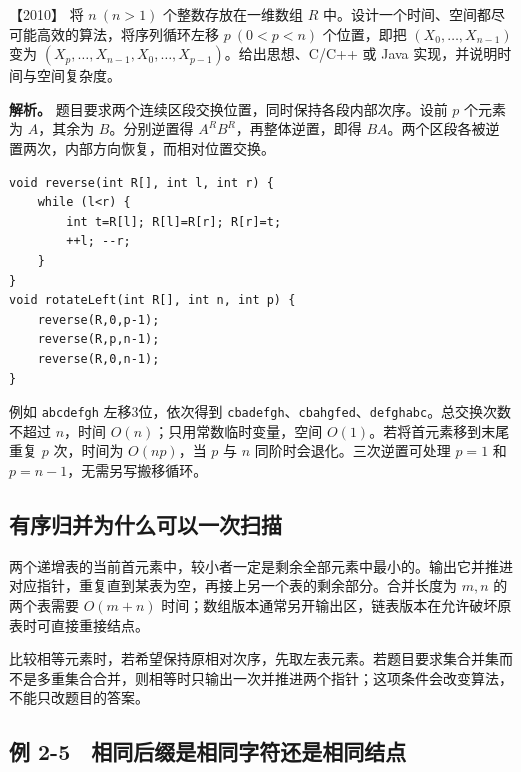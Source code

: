 \noindent{}【2010】 将 \(n\ (n>1)\) 个整数存放在一维数组 \(R\) 中。设计一个时间、空间都尽可能高效的算法，将序列循环左移 \(p\ (0<p<n)\) 个位置，即把 \((X_0,\ldots,X_{n-1})\) 变为 \((X_p,\ldots,X_{n-1},X_0,\ldots,X_{p-1})\)。给出思想、C/C++ 或 Java 实现，并说明时间与空间复杂度。


\textbf{解析。} 题目要求两个连续区段交换位置，同时保持各段内部次序。设前 \(p\) 个元素为 \(A\)，其余为 \(B\)。分别逆置得 \(A^RB^R\)，再整体逆置，即得 \(BA\)。两个区段各被逆置两次，内部方向恢复，而相对位置交换。

\par\medskip\noindent
\begin{minipage}{\linewidth}
\begin{verbatim}
void reverse(int R[], int l, int r) {
    while (l<r) {
        int t=R[l]; R[l]=R[r]; R[r]=t;
        ++l; --r;
    }
}
void rotateLeft(int R[], int n, int p) {
    reverse(R,0,p-1);
    reverse(R,p,n-1);
    reverse(R,0,n-1);
}
\end{verbatim}
\end{minipage}\par\medskip

例如 \allowbreak{}\texttt{abcdefgh} 左移3位，依次得到 \allowbreak{}\texttt{cbadefgh}、\allowbreak{}\texttt{cbahgfed}、\allowbreak{}\texttt{defghabc}。总交换次数不超过 \(n\)，时间 \(O(n)\)；只用常数临时变量，空间 \(O(1)\)。若将首元素移到末尾重复 \(p\) 次，时间为 \(O(np)\)，当 \(p\) 与 \(n\) 同阶时会退化。三次逆置可处理 \(p=1\) 和 \(p=n-1\)，无需另写搬移循环。

\subsection{有序归并为什么可以一次扫描}\label{ds-c02-h151}

两个递增表的当前首元素中，较小者一定是剩余全部元素中最小的。输出它并推进对应指针，重复直到某表为空，再接上另一个表的剩余部分。合并长度为 \(m,n\) 的两个表需要 \(O(m+n)\) 时间；数组版本通常另开输出区，链表版本在允许破坏原表时可直接重接结点。

比较相等元素时，若希望保持原相对次序，先取左表元素。若题目要求集合并集而不是多重集合合并，则相等时只输出一次并推进两个指针；这项条件会改变算法，不能只改题目的答案。

\subsection{例 2-5　相同后缀是相同字符还是相同结点}\label{ds-ex2-5}

